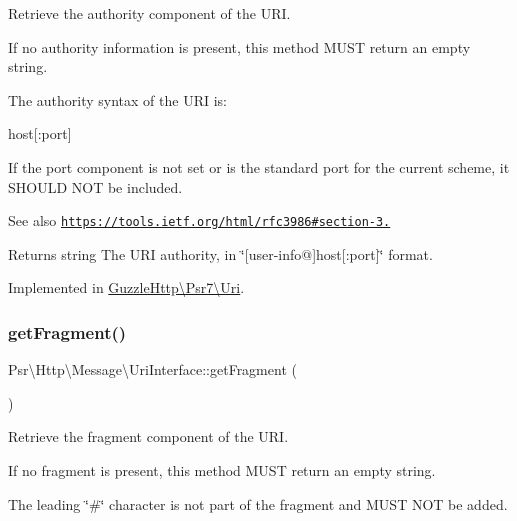 Retrieve the authority component of the U\+RI.

If no authority information is present, this method M\+U\+ST return an empty string.

The authority syntax of the U\+RI is\+:


\begin{DoxyPre}
host[:port]
\end{DoxyPre}


If the port component is not set or is the standard port for the current scheme, it S\+H\+O\+U\+LD N\+OT be included.

\begin{DoxySeeAlso}{See also}
\href{https://tools.ietf.org/html/rfc3986#section-3.2}{\tt https\+://tools.\+ietf.\+org/html/rfc3986\#section-\/3.} 
\end{DoxySeeAlso}
\begin{DoxyReturn}{Returns}
string The U\+RI authority, in \char`\"{}\mbox{[}user-\/info@\mbox{]}host\mbox{[}\+:port\mbox{]}\char`\"{} format. 
\end{DoxyReturn}


Implemented in \hyperlink{classGuzzleHttp_1_1Psr7_1_1Uri_a242d836c28cb339c59d64d704a30b7e1}{Guzzle\+Http\textbackslash{}\+Psr7\textbackslash{}\+Uri}.

\mbox{\label{interfacePsr_1_1Http_1_1Message_1_1UriInterface_a95df80b1a48010817c8c135ef5d9d5b1}} 
\subsubsection{\texorpdfstring{get\+Fragment()}{getFragment()}}
{\footnotesize\ttfamily Psr\textbackslash{}\+Http\textbackslash{}\+Message\textbackslash{}\+Uri\+Interface\+::get\+Fragment (\begin{DoxyParamCaption}{ }\end{DoxyParamCaption})}

Retrieve the fragment component of the U\+RI.

If no fragment is present, this method M\+U\+ST return an empty string.

The leading \char`\"{}\#\char`\"{} character is not part of the fragment and M\+U\+ST N\+OT be added.

